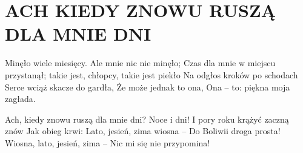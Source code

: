 \documentclass[../../../songbook.tex]{subfiles}
\begin{document}
\TabPositions{8cm} %
\section*{ACH KIEDY ZNOWU RUSZĄ DLA MNIE DNI}
{}
\vspace{0.5cm}
Minęło wiele miesięcy. 					 \newline
Ale mnie nic nie minęło; 				 \newline
Czas dla mnie w miejscu przystanął; 	 \newline
takie jest, chłopcy, takie jest piekło 	 \newline
Na odgłos kroków po schodach \newline
Serce wciąż skacze do gardła, \newline
Że może jednak to ona, \newline
Ona – to: piękna moja zagłada. \newline

\-\hspace{1cm} Ach, kiedy znowu ruszą dla mnie dni?  \newline
\-\hspace{1cm} Noce i dni! 						 \newline
\-\hspace{1cm} I pory roku krążyć zaczną znów 	 \newline
\-\hspace{1cm} Jak obieg krwi: 					 \newline
\-\hspace{1cm} Lato, jesień, zima wiosna – 		 \newline
\-\hspace{1cm} Do Boliwii droga prosta! 		 \newline
\-\hspace{1cm} Wiosna, lato, jesień, zima – 	 \newline
\-\hspace{1cm} Nic mi się nie przypomina! 		 \newline
\end{document}
